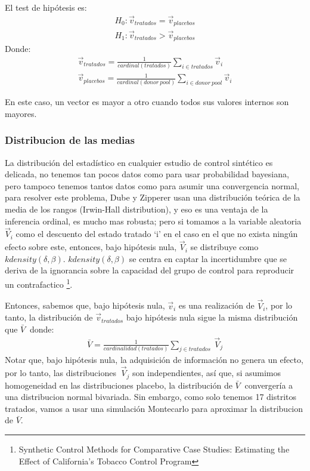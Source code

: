 \documentclass[12pt]{article}
\begin{document}
El test de hipótesis es:
\begin{align*}
    H_0:{\vec{v}}_{tratados}={\vec{v}}_{placebos}
    \\
    H_1:{\vec{v}}_{tratados}>{\vec{v}}_{placebos}
\end{align*}
Donde:
\begin{align*}
    {\vec{v}}_{tratados}=\frac{1}{cardinal(tratados)}\sum_{i\in t r a t a d o s}{\vec{v}}_i
    \\
    {\vec{v}}_{placebos}=\frac{1}{cardinal(donor\ pool)}\sum_{i\in d o n o r\ pool}{\vec{v}}_i
\end{align*}

En este caso, un vector es mayor a otro cuando todos sus valores internos son mayores. 

\subsubsection{Distribucion de las medias}

La distribución del estadístico en cualquier estudio de control sintético es delicada, no tenemos tan pocos datos como para usar probabilidad bayesiana, pero tampoco tenemos tantos datos como para asumir una convergencia normal, para resolver este problema, Dube y Zipperer usan una distribución teórica de la media de los rangos (Irwin-Hall distribution), y eso es una ventaja de la inferencia ordinal, es mucho mas robusta; pero si tomamos a la variable aleatoria {$ {\vec{V}}_i $} como el descuento del estado tratado ‘i’ en el caso en el que no exista ningún efecto sobre este, entonces, bajo hipótesis nula, {$ {\vec{V}}_i $} se distribuye como {$ kdensity(\delta,\beta) $}. {$ kdensity(\delta,\beta) $} se centra en captar la incertidumbre que se deriva de la ignorancia sobre la capacidad del grupo de control para reproducir un contrafactico \footnote{Synthetic Control Methods for Comparative Case Studies: Estimating the Effect of California’s Tobacco Control Program}.

Entonces, sabemos que, bajo hipótesis nula, {$ {\vec{v}}_i $} es una realización de {$ {\vec{V}}_i $}, por lo tanto, la distribución de {$ {\vec{v}}_{tratados} $} bajo hipótesis nula sigue la misma distribución que {$ \bar{V}\ $} donde:
\begin{align*}
    \bar{V}=\frac{1}{cardinalidad(tratados)}\sum_{j\in t r a t a d o s}{\ {\vec{V}}_j} 
\end{align*}
Notar que, bajo hipótesis nula, la adquisición de información no genera un efecto, por lo tanto, las distribuciones {$ \ {\vec{V}}_j $} son independientes, así que, si asumimos homogeneidad en las distribuciones placebo, la distribución de {$ \bar{V}\ $} convergería a una distribucion normal bivariada. Sin embargo, como solo tenemos 17 distritos tratados, vamos a usar una simulación Montecarlo para aproximar la distribucion de {$ \bar{V} $}.
\end{document}
